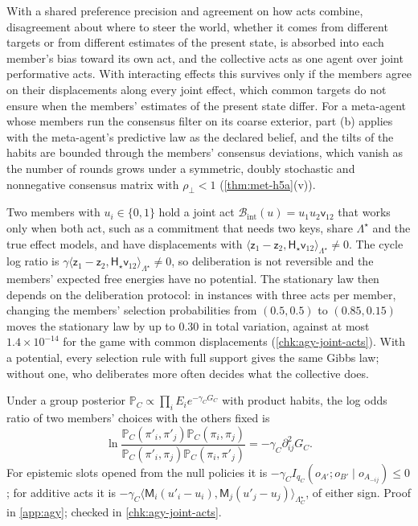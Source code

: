 With a shared preference precision and agreement on how acts combine, disagreement about where to steer the world, whether it comes from different targets or from different estimates of the present state, is absorbed into each member's bias toward its own act, and the collective acts as one agent over joint performative acts. With interacting effects this survives only if the members agree on their displacements along every joint effect, which common targets do not ensure when the members' estimates of the present state differ. For a meta-agent whose members run the consensus filter on its coarse exterior, part (b) applies with the meta-agent's predictive law as the declared belief, and the tilts of the habits are bounded through the members' consensus deviations, which vanish as the number of rounds grows under a symmetric, doubly stochastic and nonnegative consensus matrix with $\rho_\perp<1$ (\cref{thm:met-h5a}(v)).

\begin{example}\label{ex:agy-no-potential}
Two members with $u_i\in\{0,1\}$ hold a joint act $\mathcal B_{\mathrm{int}}(u)=u_1u_2\mathsf v_{12}$ that works only when both act, such as a commitment that needs two keys, share $\Lambda^\star$ and the true effect models, and have displacements with $\langle\mathsf z_1-\mathsf z_2,\mathsf H_\star\mathsf v_{12}\rangle_{\Lambda^\star}\ne0$. The cycle log ratio is $\gamma\langle\mathsf z_1-\mathsf z_2,\mathsf H_\star\mathsf v_{12}\rangle_{\Lambda^\star}\ne0$, so deliberation is not reversible and the members' expected free energies have no potential. The stationary law then depends on the deliberation protocol: in instances with three acts per member, changing the members' selection probabilities from $(0.5,0.5)$ to $(0.85,0.15)$ moves the stationary law by up to $0.30$ in total variation, against at most $1.4\times10^{-14}$ for the game with common displacements (\cref{chk:agy-joint-acts}). With a potential, every selection rule with full support gives the same Gibbs law; without one, who deliberates more often decides what the collective does.
\end{example}

\begin{proposition}\label{prop:agy-performative-sign}
Under a group posterior $\mathbb P_C\propto\prod_iE_ie^{-\gamma_CG_C}$ with product habits, the log odds ratio of two members' choices with the others fixed is
\begin{equation*}
\ln\frac{\mathbb P_C(\pi'_i,\pi'_j)\mathbb P_C(\pi_i,\pi_j)}{\mathbb P_C(\pi'_i,\pi_j)\mathbb P_C(\pi_i,\pi'_j)}=-\gamma_C\partial^2_{ij}G_C.
\end{equation*}
For epistemic slots opened from the null policies it is $-\gamma_CI_{q_C}(o_{A'};o_{B'}\mid o_{A_{-ij}})\le0$ \citep{dennis2026communicating}; for additive acts it is $-\gamma_C\langle\mathsf M_i(u'_i-u_i),\mathsf M_j(u'_j-u_j)\rangle_{\Lambda^\star_C}$, of either sign. Proof in \cref{app:agy}; checked in \cref{chk:agy-joint-acts}.
\end{proposition}

